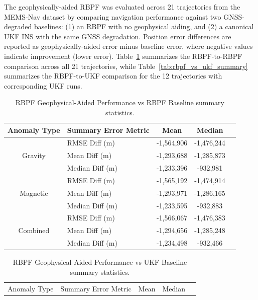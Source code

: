 \documentclass[letterpaper,times]{IONconf}
\begin{document}
The geophysically-aided RBPF was evaluated across 21 trajectories from the MEMS-Nav dataset by comparing navigation performance against two GNSS-degraded baselines: (1) an RBPF with no geophysical aiding, and (2) a canonical UKF INS with the same GNSS degradation. Position error differences are reported as geophysically-aided error minus baseline error, where negative values indicate improvement (lower error). Table~\ref{tab:rbpf_vs_rbpf_summary} summarizes the RBPF-to-RBPF comparison across all 21 trajectories, while Table~\ref{tab:rbpf_vs_ukf_summary} summarizes the RBPF-to-UKF comparison for the 12 trajectories with corresponding UKF runs. \begin{table}[h]
    \centering
    \caption{RBPF Geophysical-Aided Performance vs RBPF Baseline summary statistics.}
    \begin{tabular}{c l c c c}
        \toprule
        Anomaly Type & Summary Error Metric & Mean & Median \\
        \midrule
        \multirow{3}{*}{Gravity} & RMSE Diff (m)   & -1,564,906    & -1,476,244 \\
                                 & Mean Diff (m)   & -1,293,688    & -1,285,873 \\
                                 & Median Diff (m) & -1,233,396    &  -932,981 \\
        \midrule
        \multirow{3}{*}{Magnetic} & RMSE Diff (m)   & -1,565,192   & -1,474,914 \\
                                  & Mean Diff (m)   & -1,293,971   & -1,286,165 \\
                                  & Median Diff (m) & -1,233,595   &  -932,883 \\
        \midrule
        \multirow{3}{*}{Combined} & RMSE Diff (m)   & -1,566,067 & -1,476,383 \\
                                  & Mean Diff (m)   & -1,294,656 & -1,285,248 \\
                                  & Median Diff (m) & -1,234,498 &  -932,466 \\
        \bottomrule
    \end{tabular}
    \label{tab:rbpf_vs_rbpf_summary}
\end{table} \begin{table}[h]
    \centering
    \caption{RBPF Geophysical-Aided Performance vs UKF Baseline summary statistics.}
    \begin{tabular}{c l c c c}
        \toprule
        Anomaly Type & Summary Error Metric & Mean & Median \\

\end{tabular}
\end{table}
\end{document}
